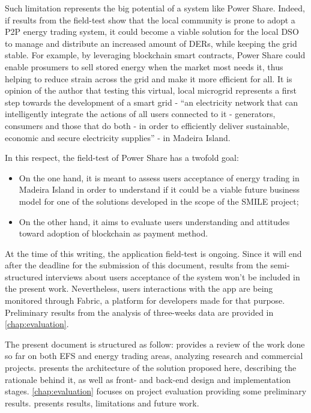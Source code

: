 Such limitation represents the big potential of a system like Power Share. Indeed, if results from the field-test show that the local community is prone to adopt a P2P energy trading system, it could become a viable solution for the local \ac{DSO} to manage and distribute an increased amount of \acp{DER}, while keeping the grid stable. For example, by leveraging blockchain smart contracts, Power Share could enable prosumers to sell stored energy when the market most needs it, thus helping to reduce strain across the grid and make it more efficient for all.
It is opinion of the author that testing this virtual, local microgrid represents a first step towards the development of a smart grid -  “an electricity network that can intelligently integrate the actions of all users connected to it - generators, consumers and those that do both - in order to efficiently deliver sustainable, economic and secure electricity supplies” \cite{OverviewSmartGrid} - in Madeira Island.


In this respect, the field-test of Power Share has a twofold goal:

\begin{itemize}
    \item On the one hand, it is meant to assess users acceptance of energy trading in Madeira Island in order to understand if it could be a viable future business model  for one of the solutions developed in the scope of the SMILE project;
\item On the other hand, it aims to evaluate users understanding  and attitudes toward adoption of blockchain as  payment method.
\end{itemize}


At the time of this writing, the application field-test is ongoing. Since it will end after the deadline for the submission of this document, results from the semi-structured interviews about users acceptance of the system won’t be included in the present work. Nevertheless, users interactions with the app are being monitored through Fabric, a platform for developers made for that purpose. Preliminary results from the analysis of three-weeks data are provided in \cref{chap:evaluation}.

The present document is structured as follow:  provides a review of the work done so far on both \ac{EFS} and energy trading areas, analyzing research and commercial projects.  presents the architecture of the solution proposed here, describing the rationale behind it, as well as front- and back-end design and implementation stages.
\cref{chap:evaluation} focuses on project evaluation providing some preliminary results.  presents results, limitations and future work.


